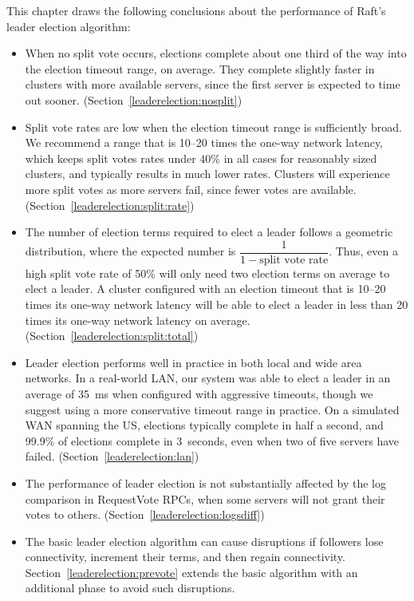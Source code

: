 This chapter draws the following conclusions about the performance of
Raft's leader election algorithm:
%
\begin{itemize}
%
\item When no split vote occurs, elections complete about one third of
the way into the election timeout range, on average. They complete
slightly faster in clusters with more available servers, since the first
server is expected to time out sooner.
(Section~\ref{leaderelection:nosplit})
%
\item Split vote rates are low when the election timeout range is
sufficiently broad. We recommend a range that is
10--20 times the one-way
network latency, which keeps split votes rates under 40\% in all cases
for reasonably sized clusters, and typically results in much lower rates.
Clusters will experience more split votes as more servers fail, since
fewer votes are available. (Section~\ref{leaderelection:split:rate})
%
\item The number of election terms required to elect a leader follows a
geometric distribution,
where the expected number is $\dfrac{1}{1-\text{split vote rate}}$.
Thus, even a high split vote rate of 50\% will only need two election
terms on average to elect a leader.
A cluster configured with an election timeout that is 10--20 times its
one-way network latency will be able to elect a leader in less than 20
times its one-way network latency on average.
(Section~\ref{leaderelection:split:total})
%
\item Leader election performs well in practice in both local and wide
area networks. In a real-world LAN, our system was able to elect a
leader in an average of \SI{35}{\milli\second} when configured with aggressive
timeouts, though we suggest using a more conservative timeout range in
practice. On a simulated WAN spanning the US, elections typically
complete in half a second, and 99.9\% of elections complete in
\SI{3}{seconds}, even when two of five servers have failed.
(Section~\ref{leaderelection:lan})
%
\item The performance of leader election is not substantially affected
by the log comparison in RequestVote RPCs, when some servers will not
grant their votes to others. (Section~\ref{leaderelection:logsdiff})
%
\item The basic leader election algorithm can cause disruptions if
followers lose connectivity, increment their terms, and then regain
connectivity. Section~\ref{leaderelection:prevote} extends the basic
algorithm with an additional phase to avoid such disruptions.
%
\end{itemize}








